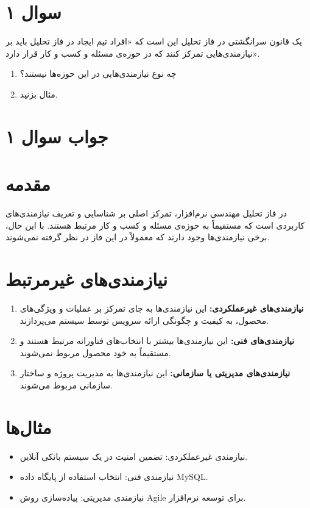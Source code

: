 \section*{سوال ۱}

یک قانون سرانگشتی در فاز تحلیل این است که «افراد تیم ایجاد در فاز تحلیل باید بر نیازمندی‌هایی تمرکز کنند که در حوزه‌ی مسئله و کسب و کار قرار دارد».
\begin{enumerate}
	\item چه نوع نیازمندی‌هایی در این حوزه‌ها نیستند؟
	\item مثال بزنید.
\end{enumerate}

\section*{جواب سوال ۱}


\section*{مقدمه}
در فاز تحلیل مهندسی نرم‌افزار، تمرکز اصلی بر شناسایی و تعریف نیازمندی‌های کاربردی است که مستقیماً به حوزه‌ی مسئله و کسب و کار مرتبط هستند. با این حال، برخی نیازمندی‌ها وجود دارند که معمولاً در این فاز در نظر گرفته نمی‌شوند.

\section*{نیازمندی‌های غیرمرتبط}
\begin{enumerate}
	\item \textbf{نیازمندی‌های غیرعملکردی:} این نیازمندی‌ها به جای تمرکز بر عملیات و ویژگی‌های محصول، به کیفیت و چگونگی ارائه سرویس توسط سیستم می‌پردازند.
	\item \textbf{نیازمندی‌های فنی:} این نیازمندی‌ها بیشتر با انتخاب‌های فناورانه مرتبط هستند و مستقیماً به خود محصول مربوط نمی‌شوند.
	\item \textbf{نیازمندی‌های مدیریتی یا سازمانی:} این نیازمندی‌ها به مدیریت پروژه و ساختار سازمانی مربوط می‌شوند.
\end{enumerate}

\section*{مثال‌ها}
\begin{itemize}
	\item نیازمندی غیرعملکردی: تضمین امنیت در یک سیستم بانکی آنلاین.
	\item نیازمندی فنی: انتخاب استفاده از پایگاه داده MySQL.
	\item نیازمندی مدیریتی: پیاده‌سازی روش Agile برای توسعه نرم‌افزار.
\end{itemize}